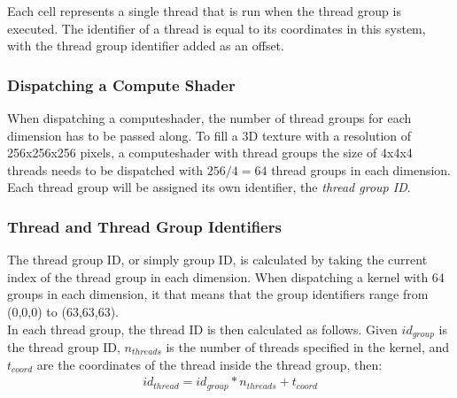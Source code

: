 \begin{figure}[H]
    \label{img:tikz:compute:threads}
\end{figure}
\noindent
Each cell represents a single thread that is run when the thread group is executed.
The identifier of a thread is equal to its coordinates in this system, with the thread group identifier added as an offset.

\subsubsection{Dispatching a Compute Shader}
When dispatching a \gls{computeshader}, the number of thread groups for each dimension has to be passed along.
To fill a 3D texture with a resolution of 256x256x256 pixels, a \gls{computeshader} with thread groups the size of 4x4x4 threads needs to be dispatched with $256 / 4 = 64$ thread groups in each dimension.
\\
Each thread group will be assigned its own identifier, the \emph{thread group ID}.

\pagebreak

\subsubsection{Thread and Thread Group Identifiers}
The thread group ID, or simply group ID, is calculated by taking the current index of the thread group in each dimension.
When dispatching a \gls{kernel} with 64 groups in each dimension, it that means that the group identifiers range from (0,0,0) to (63,63,63).
\\
In each thread group, the thread ID is then calculated as follows.
Given $id_{group}$ is the thread group ID, $n_{threads}$ is the number of threads specified in the \gls{kernel}, and  $t_{coord}$ are the coordinates of the thread inside the thread group, then:
$$
\begin{array}{l}
    id_{thread} = id_{group} * n_{threads} + t_{coord}
\end{array}
$$

